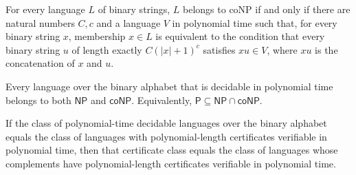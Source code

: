 \begin{theorem}
\label{Complexity.mem_coNP_iff_forall}
\leanok
{}
For every language $L$ of binary strings, $L$ belongs to coNP if and only if there are
natural numbers $C,c$ and a language $V$ in polynomial time such that, for every binary
string $x$, membership $x\in L$ is equivalent to the condition that every binary string
$u$ of length exactly $C(|x|+1)^c$ satisfies $xu\in V$, where $xu$ is the concatenation
of $x$ and $u$.
\end{theorem}

\begin{theorem}
\label{Complexity.P_subset_NP_inter_coNP}
\leanok
{}
Every language over the binary alphabet that is decidable in polynomial time belongs to
both $\mathsf{NP}$ and $\mathsf{coNP}$. Equivalently, $\mathsf{P} \subseteq \mathsf{NP}
\cap \mathsf{coNP}$.
\end{theorem}

\begin{theorem}
\label{Complexity.NP_eq_coNP_of_P_eq_NP}
\leanok
{}
If the class of polynomial-time decidable languages over the binary alphabet equals the
class of languages with polynomial-length certificates verifiable in polynomial time,
then that certificate class equals the class of languages whose complements have
polynomial-length certificates verifiable in polynomial time.
\end{theorem}
